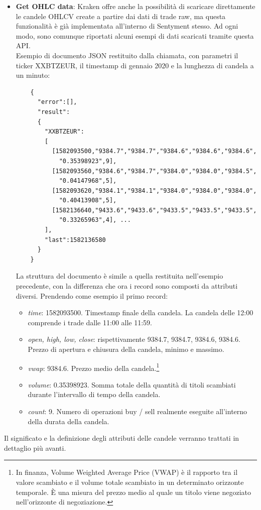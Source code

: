 \documentclass[a4paper,12pt]{report}
\begin{document}
\begin{itemize}
	\item \textbf{Get OHLC data}: Kraken offre anche la possibilità di scaricare direttamente le candele OHLCV create a partire dai dati di trade raw, ma questa funzionalità è già implementata all'interno di Sentyment stesso. Ad ogni modo, sono comunque riportati alcuni esempi di dati scaricati tramite questa API.\\
	Esempio di documento JSON restituito dalla chiamata, con parametri il ticker XXBTZEUR, il timestamp di gennaio 2020 e la lunghezza di candela a un minuto:
	\begin{verbatim}
	{
	  "error":[],
	  "result":
	  {
	    "XXBTZEUR":
	    [
	      [1582093500,"9384.7","9384.7","9384.6","9384.6","9384.6",
	        "0.35398923",9],
	      [1582093560,"9384.6","9384.7","9384.0","9384.0","9384.5",
	        "0.04147968",5],
	      [1582093620,"9384.1","9384.1","9384.0","9384.0","9384.0",
	        "0.40413908",5],
	      [1582136640,"9433.6","9433.6","9433.5","9433.5","9433.5",
	        "0.33265963",4], ...
	    ],
	    "last":1582136580
	  }
	} 
	\end{verbatim}
	
La struttura del documento è simile a quella restituita nell'esempio precedente, con la differenza che ora i record sono composti da attributi diversi. Prendendo come esempio il primo record:
	\begin{itemize}
		\item \textit{time}: 1582093500. Timestamp finale della candela. La candela delle 12:00 comprende i trade dalle 11:00 alle 11:59.
		\item \textit{open, high, low, close}: rispettivamente 9384.7, 9384.7, 9384.6, 9384.6. Prezzo di apertura e chiusura della candela, minimo e massimo.
		\item \textit{vwap}: 9384.6. Prezzo medio della candela.\footnote{In finanza, Volume Weighted Average Price (VWAP) è il rapporto tra il valore scambiato e il volume totale scambiato in un determinato orizzonte temporale. È una misura del prezzo medio al quale un titolo viene negoziato nell'orizzonte di negoziazione.}
		\item \textit{volume}: 0.35398923. Somma totale della quantità di titoli scambiati durante l'intervallo di tempo della candela.
		\item \textit{count}: 9. Numero di operazioni buy / sell realmente eseguite all'interno della durata della candela.
	\end{itemize}
\end{itemize}
Il significato e la definizione degli attributi delle candele verranno trattati in dettaglio più avanti.\\
\end{document}
